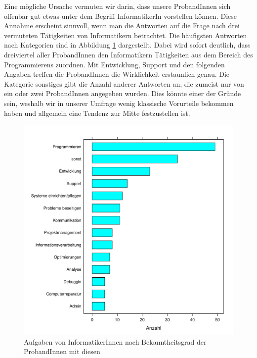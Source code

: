 \documentclass[de]{agse-empir-report}\usepackage[]{graphicx}\usepackage[]{color}
\newenvironment{knitrout}{}{} %
\begin{document}
Eine m\"ogliche Ursache vermuten wir darin, dass unsere ProbandInnen sich offenbar gut etwas unter dem Begriff InformatikerIn vorstellen k\"onnen. Diese Annahme erscheint sinnvoll, wenn man die Antworten auf die Frage nach drei vermuteten T\"atigkeiten von Informatikern betrachtet. Die h\"aufigsten Antworten nach Kategorien sind in Abbildung \ref{fig:jobs} dargestellt. Dabei wird sofort deutlich, dass dreiviertel aller ProbandInnen den Informatikern T\"atigkeiten aus dem Bereich des Programmierens zuordnen. Mit Entwicklung, Support und den folgenden Angaben treffen die ProbandInnen die Wirklichkeit erstaunlich genau. Die Kategorie sonstiges gibt die Anzahl anderer Antworten an, die zumeist nur von ein oder zwei ProbandInnen angegeben wurden. Dies k\"onnte einer der Gr\"unde sein, weshalb wir in unserer Umfrage wenig klassische Vorurteile bekommen haben und allgemein eine Tendenz zur Mitte festzustellen ist.

\begin{figure}
\begin{knitrout}
\color{fgcolor}
\includegraphics[width=\linewidth]{figure/chart_jobs-1} 

\end{knitrout}
    \caption{Aufgaben von InformatikerInnen nach Bekanntheitsgrad der ProbandInnen mit diesen}
    \label{fig:jobs}
\end{figure}
\end{document}
